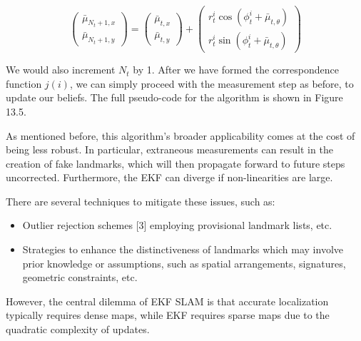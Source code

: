\begin{equation}
    \begin{pmatrix}
        \bar{\mu}_{N_t + 1, x} \\
        \bar{\mu}_{N_t + 1, y}
    \end{pmatrix} = 
    \begin{pmatrix}
        \bar{\mu}_{t, x} \\
        \bar{\mu}_{t, y}
    \end{pmatrix} +
    \begin{pmatrix}
        r_t^i \cos(\phi_t^i + \bar{\mu}_{t,\theta}) \\
        r_t^i \sin(\phi_t^i + \bar{\mu}_{t,\theta}) 
    \end{pmatrix}
\end{equation}

We would also increment $N_t$ by 1. After we have formed the correspondence function $j(i)$, we can simply proceed with the measurement step as before, to update our beliefs. The full pseudo-code for the algorithm is shown in Figure 13.5.

As mentioned before, this algorithm’s broader applicability comes at the cost of being less robust. In particular, extraneous measurements can result in the creation of fake landmarks, which will then propagate forward to future steps uncorrected. Furthermore, the EKF can diverge if non-linearities are large.

There are several techniques to mitigate these issues, such as:

\begin{itemize}
    \item  Outlier rejection schemes [3] employing provisional landmark lists, etc.
    \item Strategies to enhance the distinctiveness of landmarks which may involve prior knowledge or assumptions, such as spatial arrangements, signatures, geometric constraints, etc.
\end{itemize}

However, the central dilemma of EKF SLAM is that accurate localization typically requires dense maps, while EKF requires sparse maps due to the quadratic complexity of updates.




